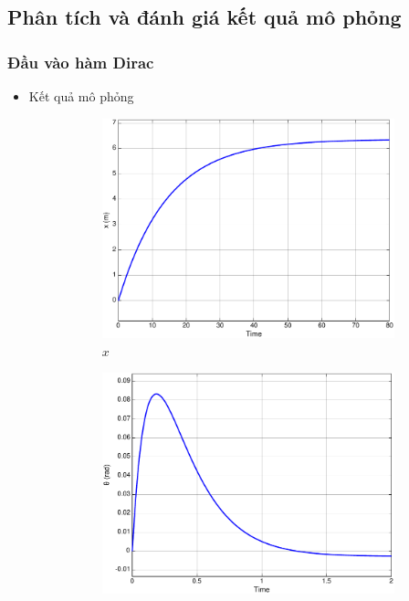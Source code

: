 \documentclass[12pt,a4paper]{article}
\begin{document}
\newpage
\subsection{Phân tích và đánh giá kết quả mô phỏng}
\subsubsection{Đầu vào hàm Dirac}
\begin{itemize}
    \item Kết quả mô phỏng 
    \begin{figure}[ht]
        \centering
        \begin{subfigure}[b]{0.495\linewidth}
            \centering
            \includegraphics[width=\linewidth]{phan_tich_x_dirac.pdf}
            \caption{$x$}
        \end{subfigure}\hfill
        \begin{subfigure}[b]{0.495\linewidth}
            \centering
            \includegraphics[width=\linewidth]{phan_tich_theta_dirac.pdf}

\end{subfigure}
\end{figure}
\end{itemize}
\end{document}
